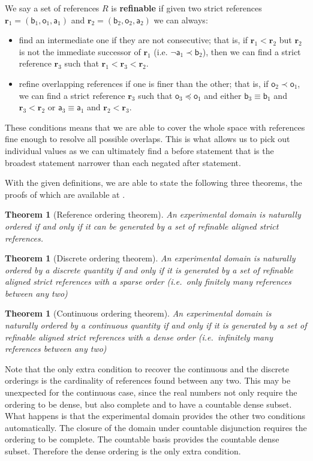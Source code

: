 \documentclass{article}
\def\NOT{\neg}
\newcommand{\stmt}[1][s] {\mathsf{#1}} %
\def\narrower{\preccurlyeq} %
\def\snarrower{\prec}
\newcommand{\refStmt}[1][r]{\textbf{#1}}
\newtheorem{thrm}[equation]{Theorem}
\begin{document}
We say a set of references $R$ is \textbf{refinable} if given two strict references $\refStmt_1 = ( \stmt[b]_1, \stmt[o]_1, \stmt[a]_1)$ and $\refStmt_2 = ( \stmt[b]_2, \stmt[o]_2, \stmt[a]_2)$ we can always:
\begin{itemize}
	\item find an intermediate one if they are not consecutive; that is, if $\refStmt[r]_1 < \refStmt[r]_2$ but $\refStmt[r]_2$ is not the immediate successor of $\refStmt[r]_1$ (i.e. $\NOT \stmt[a]_1 \snarrower \stmt[b]_2$), then we can find a strict reference $\refStmt_3$ such that $\refStmt[r]_1 < \refStmt[r]_3 < \refStmt[r]_2$.
	\item refine overlapping references if one is finer than the other; that is, if $\stmt[o]_2 \snarrower \stmt[o]_1$, we can find a strict reference $\refStmt_3$ such that $\stmt[o]_3 \narrower \stmt[o]_1$ and either $\stmt[b]_3 \equiv \stmt[b]_1$ and $\refStmt_3 < \refStmt_2$ or $\stmt[a]_3 \equiv \stmt[a]_1$ and $\refStmt_2 < \refStmt_3$.
\end{itemize}
These conditions means that we are able to cover the whole space with references fine enough to resolve all possible overlaps. This is what allows us to pick out individual values as we can ultimately find a before statement that is the broadest statement narrower than each negated after statement.

With the given definitions, we are able to state the following three theorems, the proofs of which are available at \cite{Carc3}.
\begin{thrm}[Reference ordering theorem]
	An experimental domain is naturally ordered if and only if it can be generated by a set of refinable aligned strict references.
\end{thrm}
\begin{thrm}[Discrete ordering theorem]
	An experimental domain is naturally ordered by a discrete quantity if and only if it is generated by a set of refinable aligned strict references with a sparse order (i.e.~only finitely many references between any two)
\end{thrm}
\begin{thrm}[Continuous ordering theorem]
	An experimental domain is naturally ordered by a continuous quantity if and only if it is generated by a set of refinable aligned strict references with a dense order (i.e.~infinitely many references between any two)
\end{thrm}

Note that the only extra condition to recover the continuous and the discrete orderings is the cardinality of references found between any two. This may be unexpected for the continuous case, since the real numbers not only require the ordering to be dense, but also complete and to have a countable dense subset. What happens is that the experimental domain provides the other two conditions automatically. The closure of the domain under countable disjunction requires the ordering to be complete. The countable basis provides the countable dense subset. Therefore the dense ordering is the only extra condition.
\end{document}
